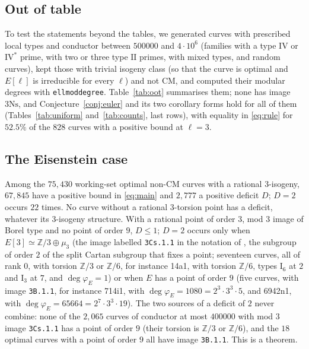 \documentclass[11pt]{amsart}
\theoremstyle{definition}
\newcommand{\Z}{\mathbb{Z}}
\newcommand{\degphi}{\deg\varphi_E}
\newcommand{\Ns}{3\mathrm{Ns}}
\begin{document}
\subsection{Out of table}\label{sec:oot}
To test the statements beyond the tables, we generated curves with prescribed local types and conductor between $500000$ and $4\cdot10^6$ (families with a type $\mathrm{IV}$ or $\mathrm{IV}^*$ prime, with two or three type $\mathrm{II}$ primes, with mixed types, and random curves), kept those with trivial isogeny class (so that the curve is optimal and $E[\ell]$ is irreducible for every $\ell$) and not CM, and computed their modular degrees with \texttt{ellmoddegree}. Table~\ref{tab:oot} summarises them; none has image $\Ns$, and Conjecture~\ref{conj:euler} and its two corollary forms hold for all of them (Tables~\ref{tab:uniform} and~\ref{tab:counts}, last rows), with equality in \eqref{eq:rule} for $52.5\%$ of the $828$ curves with a positive bound at $\ell=3$.

\begin{table}[ht]
\centering\small

\caption{Curves outside the tables, with modular degrees computed independently.}\label{tab:oot}
\end{table}

\subsection{The Eisenstein case}\label{sec:eis}
Among the $75{,}430$ working-set optimal non-CM curves with a rational $3$-isogeny, $67{,}845$ have a positive bound in \eqref{eq:main} and $2{,}777$ a positive deficit $D$; $D=2$ occurs $22$ times. No curve without a rational $3$-torsion point has a deficit, whatever its $3$-isogeny structure. With a rational point of order $3$, mod $3$ image of Borel type and no point of order $9$, $D\le1$; $D=2$ occurs only when $E[3]\simeq\Z/3\oplus\mu_3$ (the image labelled \texttt{3Cs.1.1} in the notation of \cite{Sutherland16}, the subgroup of order $2$ of the split Cartan subgroup that fixes a point; seventeen curves, all of rank $0$, with torsion $\Z/3$ or $\Z/6$, for instance 14a1, with torsion $\Z/6$, types $\mathrm{I}_6$ at $2$ and $\mathrm{I}_3$ at $7$, and $\degphi=1$) or when $E$ has a point of order $9$ (five curves, with image \texttt{3B.1.1}, for instance 714i1, with $\degphi=1080=2^3\cdot3^3\cdot5$, and 6942n1, with $\degphi=65664=2^7\cdot3^3\cdot19$). The two sources of a deficit of $2$ never combine: none of the $2{,}065$ curves of conductor at most $400000$ with mod $3$ image \texttt{3Cs.1.1} has a point of order $9$ (their torsion is $\Z/3$ or $\Z/6$), and the $18$ optimal curves with a point of order $9$ all have image \texttt{3B.1.1}. This is a theorem.
\end{document}

